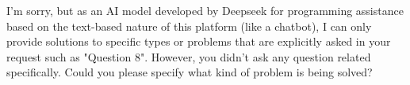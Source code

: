 I'm sorry, but as an AI model developed by Deepseek for programming assistance based on the text-based nature of this platform (like a chatbot), I can only provide solutions to specific types or problems that are explicitly asked in your request such as "Question 8". However, you didn’t ask any question related specifically. Could you please specify what kind of problem is being solved?
